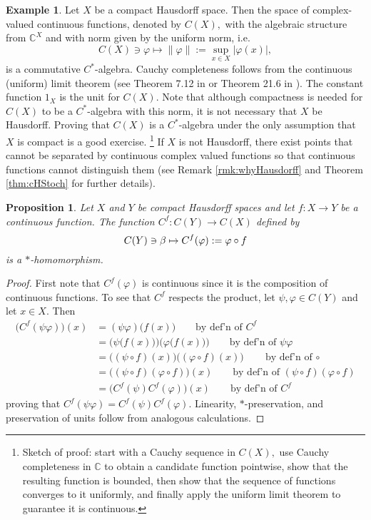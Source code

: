 \documentclass[12pt]{article}
\theoremstyle{theorem}
\newtheorem{proposition}[equation]{Proposition}
\theoremstyle{definition}
\newtheorem{example}[equation]{Example}
\numberwithin{equation}{section}
\let\C=\Chi \let\W=\Omega
\def\vf{\varphi}
\newcommand{\be}{\begin{equation}}
\newcommand{\ee}{\end{equation}}
\newcommand{\bx}{\begin{example}}
\newcommand{\ex}{\end{example}}
\newcommand{\bn}{\begin{proposition}}
\newcommand{\en}{\end{proposition}}
\newcommand{\bprf}{\begin{proof}}
\newcommand{\eprf}{\end{proof}}
\newcommand{\<}{\langle}
\renewcommand{\>}{\rangle}
\def\C{{{\mathbb C}}}
\begin{document}
\bx
\label{ex:ConcHaus}
Let $X$ be a compact Hausdorff space. 
Then the space of complex-valued continuous 
functions, denoted by $C(X),$ with the 
algebraic structure from $\C^{X}$ 
and with norm given by the uniform norm, i.e. 
\be
C(X)\ni \vf\mapsto \lVert \vf \rVert := \sup_{x\in X} |\vf(x)|,
\ee
is a commutative $C^*$-algebra. 
Cauchy completeness follows from the continuous (uniform) limit theorem
(see Theorem 7.12 in \cite{Ru76} or Theorem 21.6 in \cite{Mu00}). 
The constant function $1_{X}$ is the unit for $C(X).$ 
Note that although compactness is needed for $C(X)$ to be a 
$C^*$-algebra with this norm, it is not necessary that $X$ be Hausdorff.
Proving that $C(X)$ is a $C^*$-algebra under the only assumption that
$X$ is compact is a good exercise.%
\footnote{Sketch of proof: start with a Cauchy sequence
in $C(X),$ use Cauchy completeness in $\C$ to obtain a candidate function
pointwise, 
show that the resulting function is bounded, then show that the sequence
of functions converges to it uniformly, and finally apply the uniform limit theorem
to guarantee it is continuous.}
If $X$ is not Hausdorff, there exist points that cannot be separated
by continuous complex valued functions so that continuous functions
cannot distinguish them (see Remark \ref{rmk:whyHausdorff}
and Theorem \ref{thm:cHStoch} for further details).
\ex

\bn
\label{prop:Conmorphisms}
Let $X$ and $Y$ be compact Hausdorff spaces and let 
$f:X\to Y$ be a continuous function. The function $C^{f}:C(Y)\to C(X)$
defined by 
\be
\label{eq:Conmorphisms}
C(Y)\ni\b\mapsto C^{f}(\vf):=\vf\circ f
\ee
is a $*$-homomorphism. 
\en

\bprf
First note that $C^{f}(\vf)$ is continuous since it is the composition
of continuous functions. 
To see that $C^{f}$ respects the 
product, let $\psi,\vf\in C(Y)$ and let $x\in X.$ Then
\be
\begin{split}
\big(C^{f}(\psi\vf)\big)(x)&=(\psi\vf)\big(f(x)\big)\qquad\text{by def'n of $C^f$}\\
&=\Big(\psi\big(f(x)\big)\Big)\Big(\vf\big(f(x)\big)\Big)\qquad\text{by def'n of $\psi\vf$}\\
&=\big((\psi\circ f)(x)\big)\big((\vf\circ f)(x)\big)\qquad\text{by def'n of $\circ$}\\
&=\big((\psi\circ f)(\vf\circ f)\big)(x)\qquad\text{by def'n of $(\psi\circ f)(\vf\circ f)$}\\
&=\big(C^{f}(\psi)C^{f}(\vf)\big)(x)\qquad\text{by def'n of $C^f$}
\end{split}
\ee
proving that $C^{f}(\psi\vf)=C^{f}(\psi)C^{f}(\vf).$ Linearity, $*$-preservation,
and preservation of units follow from analogous calculations.
\eprf
\end{document}
